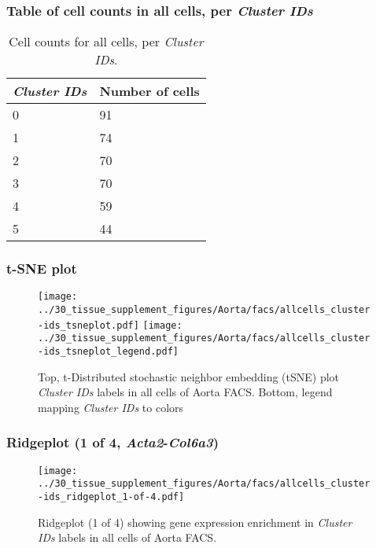 \subsubsection{Table of cell counts in all cells, per \emph{Cluster IDs}}\begin{table}[h]
\centering
\label{my-label}
\begin{tabular}{@{}ll@{}}
\toprule

\emph{Cluster IDs}& Number of cells \\ \midrule
0 & 91 \\

1 & 74 \\

2 & 70 \\

3 & 70 \\

4 & 59 \\

5 & 44 \\
\bottomrule
\end{tabular}
\caption{Cell counts for all cells, per \emph{Cluster IDs}.}
\end{table}

\clearpage
\subsubsection{t-SNE plot}
\begin{figure}[h]
\centering
\texttt{[image: ../30\_tissue\_supplement\_figures/Aorta/facs/allcells\_cluster-ids\_tsneplot.pdf]}
\texttt{[image: ../30\_tissue\_supplement\_figures/Aorta/facs/allcells\_cluster-ids\_tsneplot\_legend.pdf]}
\caption{Top, t-Distributed stochastic neighbor embedding (tSNE) plot  \emph{Cluster IDs} labels in all cells of Aorta FACS. Bottom, legend mapping \emph{Cluster IDs} to colors}
\end{figure}


\clearpage

\subsubsection{Ridgeplot (1 of 4, \emph{Acta2}-\emph{Col6a3})}
\begin{figure}[h]
\centering
\texttt{[image: ../30\_tissue\_supplement\_figures/Aorta/facs/allcells\_cluster-ids\_ridgeplot\_1-of-4.pdf]}

\caption{ Ridgeplot (1 of 4)  showing gene expression enrichment in \emph{Cluster IDs} labels in all cells of Aorta FACS. }
\end{figure}



